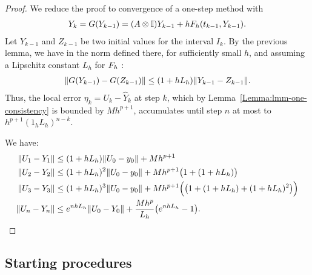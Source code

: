 \begin{proof}
  We reduce the proof to convergence of a one-step method with
  \begin{gather}
    \label{eq:lmm:18}
    Y_k = G(Y_{k-1}) =  (A\otimes \mathbb I) Y_{k-1} + h F_h(t_{k-1}, Y_{k-1}).
  \end{gather}
  Let $Y_{k-1}$ and $Z_{k-1}$ be two initial values for the interval $I_k$.
  By the previous lemma, we have in the norm defined there, for
  sufficiently small $h$, and assuming a Lipschitz constant $L_h$ for
  $F_h$ :
  \begin{gather}
    \label{eq:lmm:19}
    \lVert G(Y_{k-1})-G(Z_{k-1})\rVert \le (1+h L_h) \lVert Y_{k-1}-Z_{k-1}\rVert.
  \end{gather}
  Thus, the local error $\eta_k = U_k - \widehat Y_k$ at step $k$, which by
  Lemma~\ref{Lemma:lmm-one-consistency} is bounded by $M h^{p+1}$, accumulates
  until step $n$ at most to $h^{p+1}(1_h L_h)^{n-k}$.

  We have:
  \begin{align*}
    \lVert U_1 - Y_1\rVert &\le (1+h L_h)\lVert U_0-y_0\rVert + M h^{p+1} \\
    \lVert U_2 - Y_2\rVert &\le (1+h L_h)^2\lVert U_0-y_0\rVert +  M h^{p+1} \bigl(1+ (1+h L_h)\bigr)\\
    \lVert U_3 - Y_3\rVert &\le (1+h L_h)^3\lVert U_0-y_0\rVert +  M h^{p+1} \Bigl(\bigl(1+ (1+h L_h)+ (1+h L_h)^2\bigr)\Bigr)\\
    \lVert U_n-Y_n\rVert &\le e^{n h L_h}\lVert U_0-Y_0\rVert +
    \frac{M h^p}{L_h}\bigl(e^{n h L_h} - 1\bigr).
  \end{align*}
\end{proof}

\subsection{Starting procedures}

